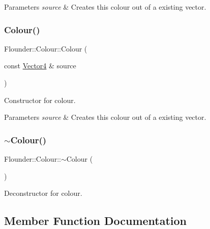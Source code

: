 \begin{DoxyParams}{Parameters}
{\em source} & Creates this colour out of a existing vector. \\
\hline
\end{DoxyParams}
\mbox{\label{class_flounder_1_1_colour_a82555ece314688c6aa52328ed41933eb}} 
\subsubsection{\texorpdfstring{Colour()}{Colour()}\hspace{0.1cm}{\footnotesize\ttfamily [6/6]}}
{\footnotesize\ttfamily Flounder\+::\+Colour\+::\+Colour (\begin{DoxyParamCaption}\item[{const \hyperlink{class_flounder_1_1_vector4}{Vector4} \&}]{source }\end{DoxyParamCaption})}



Constructor for colour. 


\begin{DoxyParams}{Parameters}
{\em source} & Creates this colour out of a existing vector. \\
\hline
\end{DoxyParams}
\mbox{\label{class_flounder_1_1_colour_a8d3e28d448e13a736421120454c4a7bb}} 
\subsubsection{\texorpdfstring{$\sim$\+Colour()}{~Colour()}}
{\footnotesize\ttfamily Flounder\+::\+Colour\+::$\sim$\+Colour (\begin{DoxyParamCaption}{ }\end{DoxyParamCaption})}



Deconstructor for colour. 



\subsection{Member Function Documentation}
\mbox{\label{class_flounder_1_1_colour_a3794da84380a1e65b8a8c6d02c273cd4}} 
